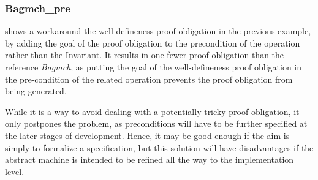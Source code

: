 \documentclass[11pt,journal]{IEEEtran}
\begin{document}
	\subsubsection{Bagmch\_pre} shows a workaround the well-defineness proof obligation in the previous example, by adding the goal of the proof obligation to the precondition of the operation rather than the Invariant. It results in one fewer proof obligation than the reference \emph{Bagmch}, as putting the goal of the well-defineness proof obligation in the pre-condition of the related operation prevents the proof obligation from being generated.
	
	While it is a way to avoid dealing with a potentially tricky proof obligation, it only postpones the problem, as preconditions will have to be further specified at the later stages of development. Hence, it may be good enough if the aim is simply to formalize a specification, but this solution will have disadvantages if the abstract machine is intended to be refined all the way to the implementation level. 
	
\end{document}
